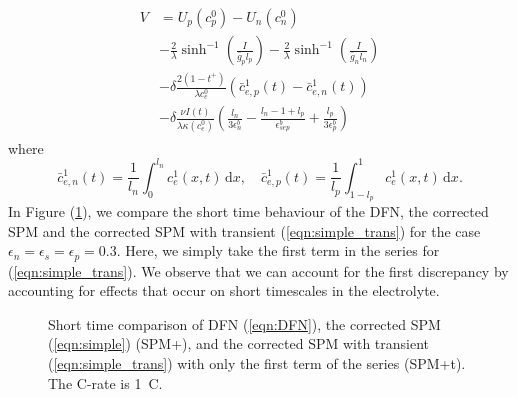 \documentclass[preprint]{elsarticle}
\begin{document}
\begin{align}\label{eqn:simple_trans}
\begin{split} 
V &= U_p(c_p^0) - U_n(c_n^0) \\
	 & - \frac{2}{\lambda}\sinh^{-1}\left( \frac{I}{\bar{g}_p l_p} \right) 
     - \frac{2}{\lambda} \sinh^{-1}\left( \frac{I}{\bar{g}_n l_n} \right) \\ 
     &-\delta\frac{ 2(1-t^+) }{\lambda c_e^0}\left(\bar{c}_{e,p}^1(t)-\bar{c}_{e,n}^1(t) \right) \\ 
    & - \delta \frac{\nu I(t)}{\lambda \kappa(c_e^0)} \left(\frac{l_n}{3\epsilon_n^b} - \frac{l_n - 1 + l_p}{\epsilon_{sep}^b} + \frac{l_p}{3\epsilon_p^b} \right)
\end{split}
\end{align} 
where 
\begin{equation*}
	\bar{c}_{e,n}^1(t) = \frac{1}{l_n}\int_{0}^{l_n}c_{e}^1(x,t)\, \text{d}x, \quad 		\bar{c}_{e,p}^1(t) = \frac{1}{l_p}\int_{1-l_p}^{1}c_{e}^1(x,t)\, \text{d}x.
\end{equation*}
In Figure (\ref{fig:transient}), we compare the short time behaviour of the DFN, the corrected SPM and the corrected SPM with transient (\ref{eqn:simple_trans}) for the case $\epsilon_n=\epsilon_s=\epsilon_p=0.3$. Here, we simply take the first term in the series for (\ref{eqn:simple_trans}). We observe that we can account for the first discrepancy by accounting for effects that occur on short timescales in the electrolyte. \\

\begin{figure}[h] 
	\centering
	\transient
	\caption{Short time comparison of DFN (\ref{eqn:DFN}), the corrected SPM (\ref{eqn:simple}) (SPM+), and the corrected SPM with transient (\ref{eqn:simple_trans}) with only the first term of the series (SPM+t). The C-rate is \SI{1}{C}.} \label{fig:transient} 
\end{figure} 
\end{document}
